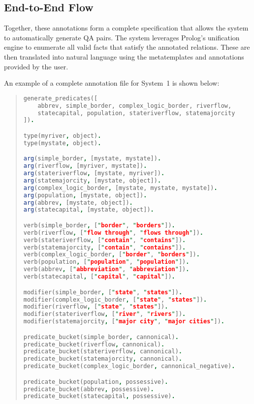 \documentclass{article}
\begin{document}
\subsection{End-to-End Flow}

Together, these annotations form a complete specification that allows the system to automatically generate QA pairs. 
The system leverages Prolog’s unification engine to enumerate all valid facts that satisfy the annotated relations. 
These are then translated into natural language using the metatemplates and annotations provided by the user.

An example of a complete annotation file for System~1 is shown below:

\begin{quote}
\begin{lstlisting}[language=Prolog]
generate_predicates([
    abbrev, simple_border, complex_logic_border, riverflow, 
    statecapital, population, stateriverflow, statemajorcity
]).

type(myriver, object).
type(mystate, object).

arg(simple_border, [mystate, mystate]).
arg(riverflow, [myriver, mystate]).
arg(stateriverflow, [mystate, myriver]).
arg(statemajorcity, [mystate, object]).
arg(complex_logic_border, [mystate, mystate, mystate]).
arg(population, [mystate, object]).
arg(abbrev, [mystate, object]).
arg(statecapital, [mystate, object]).

verb(simple_border, ["border", "borders"]).
verb(riverflow, ["flow through", "flows through"]).
verb(stateriverflow, ["contain", "contains"]).
verb(statemajorcity, ["contain", "contains"]).
verb(complex_logic_border, ["border", "borders"]).
verb(population, ["population", "population"]).
verb(abbrev, ["abbreviation", "abbreviation"]).
verb(statecapital, ["capital", "capital"]).

modifier(simple_border, ["state", "states"]).
modifier(complex_logic_border, ["state", "states"]).
modifier(riverflow, ["state", "states"]).
modifier(stateriverflow, ["river", "rivers"]).
modifier(statemajorcity, ["major city", "major cities"]).

predicate_bucket(simple_border, cannonical).
predicate_bucket(riverflow, cannonical).
predicate_bucket(stateriverflow, cannonical).
predicate_bucket(statemajorcity, cannonical).
predicate_bucket(complex_logic_border, cannonical_negative).

predicate_bucket(population, possessive).
predicate_bucket(abbrev, possessive).
predicate_bucket(statecapital, possessive).
\end{lstlisting}
\end{quote}
\end{document}
